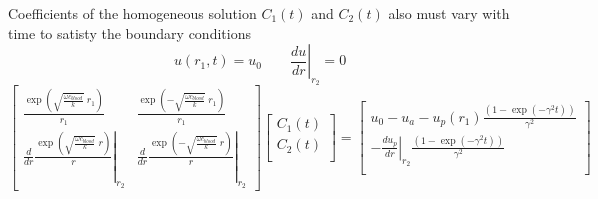 \documentclass{article}         %
\theoremstyle{definition}
\theoremstyle{remark}
\begin{document}
Coefficients of the homogeneous solution $C_1(t)$ and $C_2(t)$ also must vary with
time to satisty the boundary conditions
\[
 u(r_1,t) = u_0
  \qquad
 \left. \frac{d u}{dr} \right|_{r_2}  = 0
\]
\[
\begin{bmatrix}
    \frac{\exp\left( \sqrt{\frac{\omega c_\textit{blood}}{k}} \; r_1 \right)}{r_1}  
  & 
    \frac{\exp\left(-\sqrt{\frac{\omega c_\textit{blood}}{k}} \; r_1 \right)}{r_1}  
  \\
  \left.
   \frac{d}{dr}
    \frac{\exp\left( \sqrt{\frac{\omega c_\textit{blood}}{k}} \; r \right)}{r}  
  \right|_{r_2}
  & 
  \left.
   \frac{d}{dr}
    \frac{\exp\left(-\sqrt{\frac{\omega c_\textit{blood}}{k}} \; r \right)}{r}  
  \right|_{r_2}
\end{bmatrix}
\begin{bmatrix}
  C_1(t) \\
  C_2(t) \\
\end{bmatrix}
= 
\begin{bmatrix}
      u_0 - u_a - u_p(r_1)  
 \frac{\left( 1 - \exp(-\gamma^2 t)\right)}{ \gamma^2}  
   \\
  - \left. \frac{d u_p}{dr} 
  \right|_{r_2}
 \frac{\left( 1 - \exp(-\gamma^2 t)\right)}{ \gamma^2}  
\\
\end{bmatrix}
\]
\end{document}
